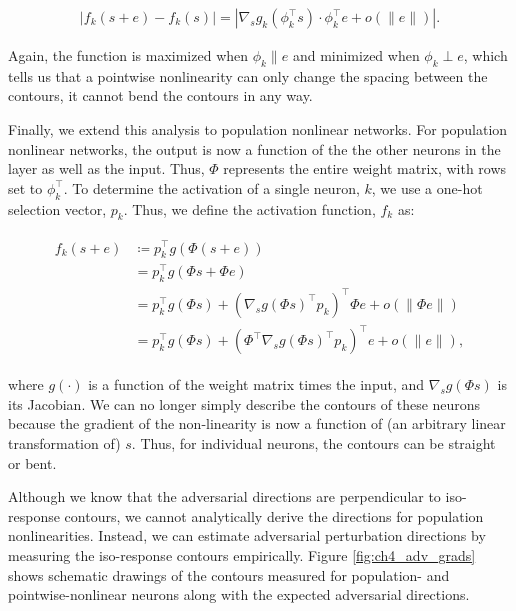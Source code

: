 \begin{equation}
\begin{split}
    |f_{k}(s+e) - f_{k}(s)| = |\nabla_{s}g_{k}(\phi_{k}^\top s) \cdot \phi_{k}^\top e + o(\|e\|)|.
\end{split}
\end{equation}

Again, the function is maximized when $\phi_{k} \parallel e$ and minimized when $\phi_{k} \perp e$, which tells us that a pointwise nonlinearity can only change the spacing between the contours, it cannot bend the contours in any way.

Finally, we extend this analysis to population nonlinear networks.
For population nonlinear networks, the output is now a function of the the other neurons in the layer as well as the input.
Thus, $\Phi$ represents the entire weight matrix, with rows set to $\phi_{k}^\top$.
To determine the activation of a single neuron, $k$, we use a one-hot selection vector, $p_{k}$.
Thus, we define the activation function, $f_{k}$ as:

\begin{align}\label{eq:pop_nonlinear}
\begin{split}
   f_{k}(s+e) &\coloneqq p_{k}^\top g(\Phi(s+e)) \\
   &= p_{k}^\top g(\Phi s + \Phi e) \\
   &= p_{k}^\top g(\Phi s) + (\nabla_{s}g(\Phi s)^\top p_{k})^\top \Phi e + o(\|\Phi e\|) \\
   &= p_{k}^\top g(\Phi s) + (\Phi^\top \nabla_{s}g(\Phi s)^\top p_{k})^\top e + o(\|e\|),
\end{split}
\end{align}

where $g(\cdot)$ is a function of the weight matrix times the input, and $\nabla_{s}g(\Phi s)$ is its Jacobian.
We can no longer simply describe the contours of these neurons because the gradient of the non-linearity is now a function of (an arbitrary linear transformation of) $s$.
Thus, for individual neurons, the contours can be straight or bent.

Although we know that the adversarial directions are perpendicular to iso-response contours, we cannot analytically derive the directions for population nonlinearities.
Instead, we can estimate adversarial perturbation directions by measuring the iso-response contours empirically.
Figure \ref{fig:ch4_adv_grads} shows schematic drawings of the contours measured for population- and pointwise-nonlinear neurons along with the expected adversarial directions.

